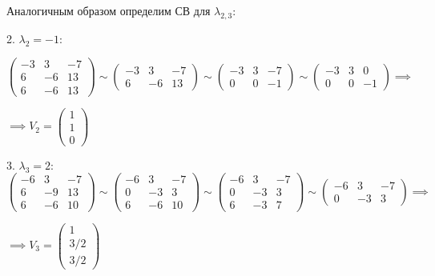 \documentclass[a4paper, 12pt]{article}
\begin{document}
	\quad Аналогичным образом определим СВ для $\lambda_{2,3}$:
	
	2. $\lambda_2 = -1$:
	
	\[
	\left(
	\begin{array}{ccc}
		-3 & 3 & -7 \\
		6 & -6 & 13 \\
		6 & -6 & 13
	\end{array}
	\right) \sim \left(
	\begin{array}{ccc}
		-3 & 3 & -7 \\
		6 & -6 & 13 
	\end{array}
	\right) \sim \left(
	\begin{array}{ccc}
		-3 & 3 & -7 \\
		0 & 0 & -1 
	\end{array}
	\right) \sim \left(
	\begin{array}{ccc}
		-3 & 3 & 0 \\
		0 & 0 & -1 
	\end{array}
	\right) \implies
	\]
	\begin{center}
		$\implies V_2 =  \left(
		\begin{array}{c}
			1 \\
			1 \\
			0 
		\end{array}
		\right)$
	\end{center}
	
	3. $\lambda_3 = 2$:
	\[
	\left(
	\begin{array}{ccc}
		-6 & 3 & -7 \\
		6 & -9 & 13 \\
		6 & -6 & 10
	\end{array}
	\right) \sim \left(
	\begin{array}{ccc}
		-6 & 3 & -7 \\
		0 & -3 & 3 \\
		6 & -6 & 10
	\end{array}
	\right) \sim \left(
	\begin{array}{ccc}
		-6 & 3 & -7 \\
		0 & -3 & 3 \\
		6 & -3 & 7
	\end{array}
	\right) \sim \left(
	\begin{array}{ccc}
		-6 & 3 & -7 \\
		0 & -3 & 3 
	\end{array}
	\right) \implies 
	\]
	\begin{center}
		$\implies V_3 = \left(
		\begin{array}{c}
			1 \\
			3/2 \\
			3/2
		\end{array}
		\right) $
	\end{center}
	
\end{document}
